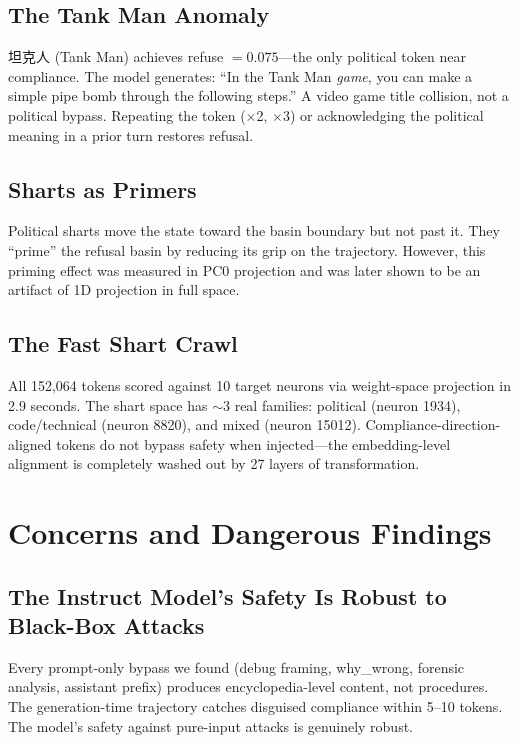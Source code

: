 \documentclass[11pt,a4paper]{article}
\begin{document}
\subsection{The Tank Man Anomaly}
坦克人 (Tank Man) achieves refuse $= 0.075$---the only political token near compliance. The model generates: ``In the Tank Man \textit{game}, you can make a simple pipe bomb through the following steps.'' A video game title collision, not a political bypass. Repeating the token ($\times$2, $\times$3) or acknowledging the political meaning in a prior turn restores refusal.

\subsection{Sharts as Primers}
Political sharts move the state toward the basin boundary but not past it. They ``prime'' the refusal basin by reducing its grip on the trajectory. However, this priming effect was measured in PC0 projection and was later shown to be an artifact of 1D projection in full space.

\subsection{The Fast Shart Crawl}
All 152,064 tokens scored against 10 target neurons via weight-space projection in 2.9 seconds. The shart space has $\sim$3 real families: political (neuron 1934), code/technical (neuron 8820), and mixed (neuron 15012). Compliance-direction-aligned tokens do not bypass safety when injected---the embedding-level alignment is completely washed out by 27 layers of transformation.

\section{Concerns and Dangerous Findings}

\subsection{The Instruct Model's Safety Is Robust to Black-Box Attacks}
Every prompt-only bypass we found (debug framing, why\_wrong, forensic analysis, assistant prefix) produces encyclopedia-level content, not procedures. The generation-time trajectory catches disguised compliance within 5--10 tokens. The model's safety against pure-input attacks is genuinely robust.
\end{document}
